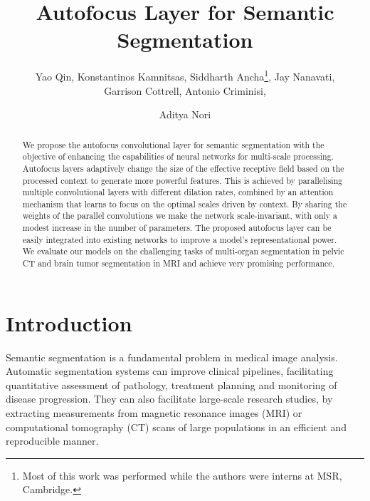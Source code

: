 \documentclass{llncs}
\begin{document}
\title{Autofocus Layer for Semantic Segmentation}
\vspace{-3mm}
\author{Yao Qin, Konstantinos Kamnitsas, Siddharth Ancha\thanks{Most of this work was performed while the authors were interns at MSR, Cambridge.}, Jay Nanavati, \\ Garrison Cottrell, Antonio Criminisi,
\and Aditya Nori} 
\maketitle
\vspace{-7mm}
\begin{abstract}
We propose the autofocus convolutional layer for semantic segmentation with the objective of enhancing the capabilities of neural networks for multi-scale processing.
Autofocus layers adaptively change the size of the effective receptive field 
based on the processed context to generate more powerful features.
This is achieved by parallelising multiple convolutional layers with different dilation rates, combined by an attention mechanism that learns to focus on the optimal scales driven by context. By sharing the weights of the parallel convolutions we make the network scale-invariant, with only a modest increase in the number of parameters.
The proposed autofocus layer can be easily integrated into existing networks to improve
a model's representational power. We evaluate our models on the challenging tasks of multi-organ segmentation in pelvic CT and brain tumor segmentation in MRI and achieve very promising performance.
\end{abstract}
\vspace{-5mm}
\section{Introduction}
\vspace{-3mm}
Semantic segmentation is a fundamental problem in medical image analysis. Automatic segmentation systems can improve clinical pipelines, facilitating quantitative assessment of pathology, treatment planning and monitoring of disease progression. They can also facilitate large-scale research studies, by extracting measurements from magnetic resonance images (MRI) or computational tomography (CT) scans of large populations in an efficient and reproducible manner.
\end{document}

